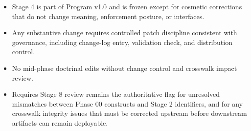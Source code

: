 \documentclass[10pt]{article}
\begin{document}
\begin{itemize}
\item Stage 4 is part of Program v1.0 and is frozen except for cosmetic corrections that do not change meaning, enforcement posture, or interfaces.
\item Any substantive change requires controlled patch discipline consistent with governance, including change-log entry, validation check, and distribution control.
\item No mid-phase doctrinal edits without change control and crosswalk impact review.
\item Requires Stage 8 review remains the authoritative flag for unresolved mismatches between Phase 00 constructs and Stage 2 identifiers, and for any crosswalk integrity issues that must be corrected upstream before downstream artifacts can remain deployable.
\end{itemize}
\end{document}
